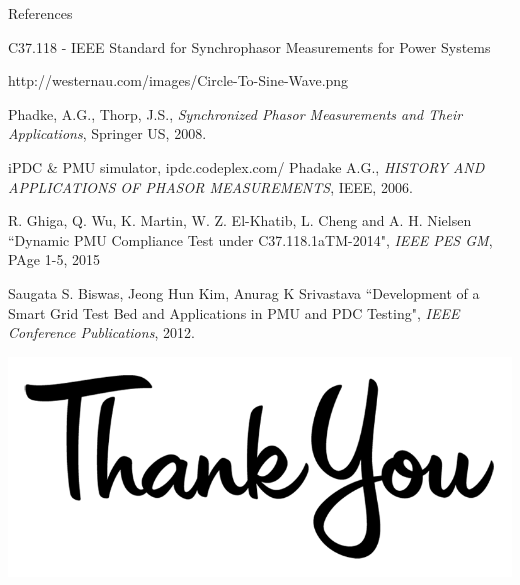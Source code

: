 \documentclass{beamer}
\begin{document}
   
    \begin{frame}{References}
\begin{thebibliography}{1}
	\tiny
	
	 C37.118 - IEEE Standard for Synchrophasor Measurements for Power Systems
	
	http://westernau.com/images/Circle-To-Sine-Wave.png
	
	Phadke, A.G., Thorp, J.S.,  \textit{Synchronized Phasor Measurements and Their Applications}, Springer US, 2008.
	
	iPDC \& PMU simulator, ipdc.codeplex.com/ 
	Phadake A.G., \textit{HISTORY AND APPLICATIONS OF PHASOR MEASUREMENTS}, IEEE, 2006.
	
	
	R. Ghiga, Q. Wu, K. Martin, W. Z. El-Khatib, L. Cheng and A. H. Nielsen ``Dynamic PMU Compliance Test under C37.118.1aTM-2014", \textit{IEEE PES GM}, PAge 1-5, 2015
	
	Saugata S. Biswas, Jeong Hun Kim, Anurag K Srivastava ``Development of a Smart Grid Test Bed and Applications in PMU and PDC Testing", \textit{IEEE Conference Publications}, 2012.	
	

\end{thebibliography}
    \end{frame}


   \begin{frame}
   \begin{center}
   \includegraphics[scale=0.3]{thanku.png}
   \end{center}
   \end{frame}
\end{document}
